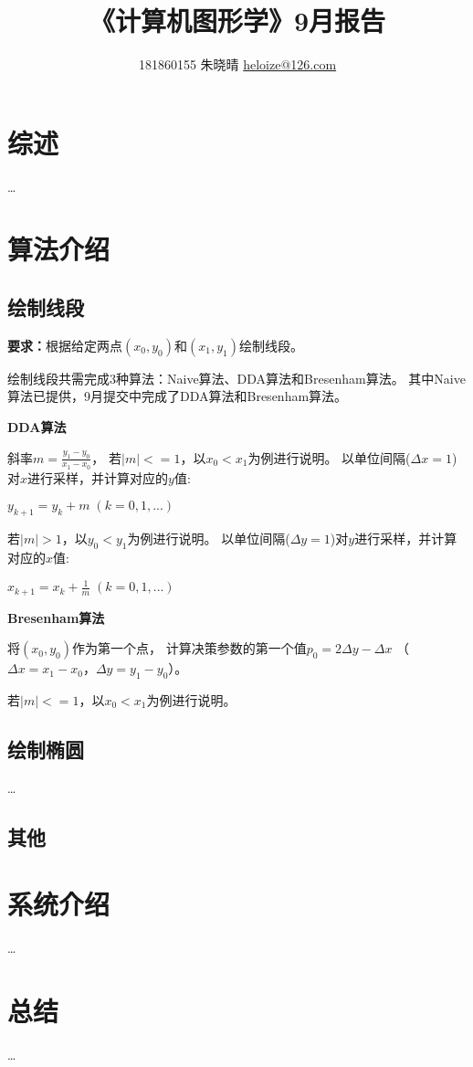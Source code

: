 \documentclass[a4paper,UTF8]{article}
\theoremstyle{definition}
\begin{document}
\title{\textbf{《计算机图形学》9月报告}}
\author{181860155 朱晓晴 \href{mailto:xxx@xxx.com}{heloize@126.com}}
\maketitle

\section{综述}
\dots

\section{算法介绍}
\subsection{绘制线段}
\textbf{要求：}根据给定两点$(x_0,y_0)$和$(x_1,y_1)$绘制线段。

绘制线段共需完成3种算法：Naive算法、DDA算法和Bresenham算法。
其中Naive算法已提供，9月提交中完成了DDA算法和Bresenham算法。

\textbf{DDA算法}

斜率$m=\frac{y_1-y_0}{x_1-x_0}$，
若$|m|<=1$，以$x_0<x_1$为例进行说明。
以单位间隔($\Delta x=1$)对$x$进行采样，并计算对应的$y$值:

$y_{k+1}=y_k+m\;(k=0,1,...)$

若$|m|>1$，以$y_0<y_1$为例进行说明。
以单位间隔($\Delta y=1$)对$y$进行采样，并计算对应的$x$值:

$x_{k+1}=x_k+\frac{1}{m}\;(k=0,1,...)$

\textbf{Bresenham算法}

将$(x_0,y_0)$作为第一个点，
计算决策参数的第一个值$p_0=2\Delta y-\Delta x$
（$\Delta x=x_1-x_0$，$\Delta y=y_1-y_0$）。

若$|m|<=1$，以$x_0<x_1$为例进行说明。


\subsection{绘制椭圆}
\dots

\subsection{其他}
		
\section{系统介绍}
\dots

\section{总结}
\dots

%




\end{document}
